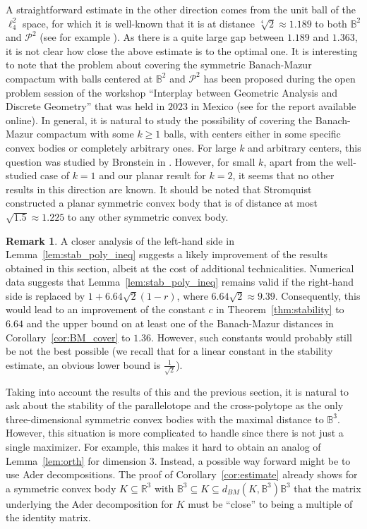 \documentclass[12pt,a4paper]{article}
\theoremstyle{definition}
\newtheorem{remark}[twr]{Remark}
\newcommand\R{\mathbb{R}}
\newcommand\B{\mathbb{B}}
\newcommand\CP{\mathcal{P}}
\begin{document}
A straightforward estimate in the other direction comes from the unit ball of the $\ell_4^2$ space, for which it is well-known that it is at distance $\sqrt[4]{2} \approx 1.189$ to both $\B^2$ and $\CP^2$ (see for example \cite[Proposition~$37.6$]{tomczak}). As there is a quite large gap between $1.189$ and $1.363$, it is not clear how close the above estimate is to the optimal one. It is interesting to note that the problem about covering the symmetric Banach-Mazur compactum with balls centered at $\B^2$ and $\CP^2$ has been proposed during the open problem session of the workshop ``Interplay between Geometric Analysis and Discrete Geometry'' that was held in $2023$ in Mexico (see \cite{workshopreport} for the report available online). In general, it is natural to study the possibility of covering the Banach-Mazur compactum with some $k \geq 1$ balls, with centers either in some specific convex bodies or completely arbitrary ones. For large $k$ and arbitrary centers, this question was studied by Bronstein in \cite{bronstein}. However, for small $k$, apart from the well-studied case of $k=1$ and our planar result for $k=2$, it seems that no other results in this direction are known. It should be noted that Stromquist~\cite{stromquist} constructed a planar symmetric convex body that is of distance at most $\sqrt{1.5} \approx 1.225$ to any other symmetric convex body.



\begin{remark}
A closer analysis of the left-hand side in Lemma~\ref{lem:stab_poly_ineq} suggests a likely improvement of the results obtained in this section, albeit at the cost of additional technicalities. Numerical data suggests that Lemma~\ref{lem:stab_poly_ineq} remains valid if the right-hand side is replaced by $1 + 6.64 \sqrt{2} (1 - r)$, where $6.64 \sqrt{2} \approx 9.39$. Consequently, this would lead to an improvement of the constant $c$ in Theorem~\ref{thm:stability} to $6.64$ and the upper bound on at least one of the Banach-Mazur distances in Corollary~\ref{cor:BM_cover} to $1.36$. However, such constants would probably still be not the best possible (we recall that for a linear constant in the stability estimate, an obvious lower bound is $\frac{1}{\sqrt{2}}$).
\end{remark}



Taking into account the results of this and the previous section, it is natural to ask about the stability of the parallelotope and the cross-polytope as the only three-dimensional symmetric convex bodies with the maximal distance to $\B^3$. However, this situation is more complicated to handle since there is not just a single maximizer. For example, this makes it hard to obtain an analog of Lemma~\ref{lem:orth} for dimension $3$. Instead, a possible way forward might be to use Ader decompositions. The proof of Corollary~\ref{cor:estimate} already shows for a symmetric convex body $K \subseteq \R^3$ with $\B^3 \subseteq K \subseteq d_{BM}(K,\B^3) \B^3$ that the matrix underlying the Ader decomposition for $K$ must be ``close'' to being a multiple of the identity matrix.
\end{document}
